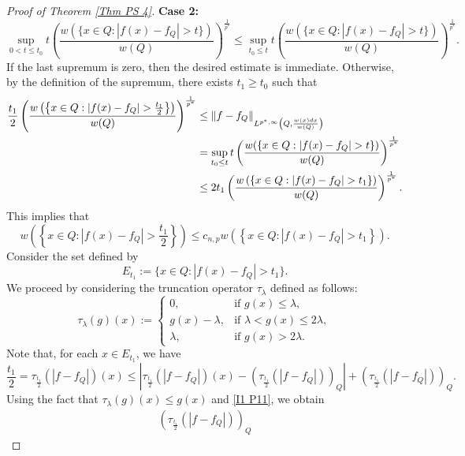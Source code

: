 \documentclass[reqno, 10pt, oneside]{amsart}
\numberwithin{equation}{section}
\newcommand{\strt}[1]{\rule{0pt}{#1}}
\numberwithin{theorem}{section}
\newcommand{\1}{{\rm 1\hspace*{-0.4ex}%
\rule{0.1ex}{1.52ex}\hspace*{0.2ex}}}
\begin{document}
\begin{proof}[Proof of Theorem \ref{Thm PS 4}]
\textbf{Case 2:}
\begin{equation*}
    \sup_{0<t\le t_0} t \left(\frac{w(\{x\in Q:|f(x)-f_Q|>t\})}{w(Q)}\right)^\frac{1}{p^*} \le \sup_{t_0\le t} t \left(\frac{w(\{x\in Q:|f(x)-f_Q|>t\})}{w(Q)}\right)^\frac{1}{p^*}.
\end{equation*}
If the last supremum is zero, then the desired estimate is immediate. Otherwise, by the definition of the supremum, there exists $t_1\ge t_0$ such that
\begin{align*}
    \frac{t_1}{2} \left( \frac{w\left(\left\{x\in Q:|f(x)-f_Q|>\frac{t_1}{2}\right\}\right)}{w(Q)} \right)^\frac{1}{p^*} 
    &\le \left\| f-f_Q\right\|_{\strt{2.3ex} L^{p^*,\infty}\left(Q,\frac{w(x)dx}{w(Q)}\right)} \\
    &= \sup_{t_0\le t} t \left(\frac{w(\{x\in Q:|f(x)-f_Q|>t\})}{w(Q)}\right)^\frac{1}{p^*} \\
    &\le 2t_1 \left( \frac{w\left(\left\{x\in Q:|f(x)-f_Q|>t_1\right\}\right)}{w(Q)} \right)^\frac{1}{p^*}.
\end{align*}
This implies that 
\begin{equation}\label{level comparison fQ}
    w\left(\left\{x\in Q:|f(x)-f_Q|>\frac{t_1}{2}\right\}\right) \le c_{n,p} w\left(\left\{x\in Q:|f(x)-f_Q|>t_1\right\}\right).
\end{equation}
Consider the set defined by 
\begin{equation*}
    E_{t_1}:=\{x\in Q:|f(x)-f_Q|>t_1\}.
\end{equation*}
We proceed by considering the truncation operator
$\tau_\lambda$ defined as follows:
\begin{equation*}
    \tau_\lambda(g)(x):=\begin{cases}0, & \text{if } g(x)\le \lambda,\\ g(x)-\lambda, & \text{if } \lambda<g(x)\le 2\lambda,\\ \lambda, & \text{if } g(x)>2\lambda.\end{cases}
\end{equation*}
Note that, for each $x\in E_{t_1}$, we have
\begin{equation*}
    \frac{t_1}{2}=\tau_{\frac{t_1}{2}}(|f-f_Q|)(x) \le \left| \tau_{\frac{t_1}{2}}(|f-f_Q|)(x)-\left(\tau_{\frac{t_1}{2}}(|f-f_Q|)\right)_Q \right|+\left(\tau_{\frac{t_1}{2}}(|f-f_Q|)\right)_Q.
\end{equation*}
Using the fact that $\tau_\lambda(g)(x)\le g(x)$ and \eqref{I1 P11}, we obtain
\begin{align*}
    \left(\tau_{\frac{t_1}{2}}(|f-f_Q|)\right)_Q

\end{align*}
\end{proof}
\end{document}
